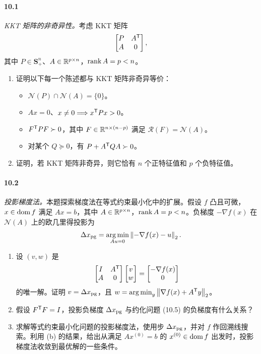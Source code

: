 \paragraph{10.1} \emph{KKT 矩阵的非奇异性。}考虑 KKT 矩阵
\[\begin{bmatrix}P&A^\mathsf T\\A&0\end{bmatrix},\]
其中 $P\in\mathbf S_+^n$、$A\in\mathbb R^{p\times n}$，$\operatorname{rank} A=p<n$。
\begin{enumerate}[label=(\alph*)]
\item 证明以下每一个陈述都与 KKT 矩阵非奇异等价：
\begin{itemize}
\item $\mathcal N(P)\cap\mathcal N(A)=\{0\}$。
\item $Ax=0$、$x\ne0\Longrightarrow x^\mathsf T Px>0$。
\item $F^\mathsf T PF\succ0$，其中 $F\in\mathbb R^{n\times(n-p)}$ 满足 $\mathcal R(F)=\mathcal N(A)$。
\item 对某个 $Q\succeq0$，有 $P+A^\mathsf T QA\succ0$。
\end{itemize}
\item 证明，若 KKT 矩阵非奇异，则它恰有 $n$ 个正特征值和 $p$ 个负特征值。
\end{enumerate}

\paragraph{10.2} \emph{投影梯度法。}本题探索梯度法在等式约束最小化中的扩展。假设 $f$ 凸且可微，$x\in\operatorname{dom} f$ 满足 $Ax=b$，其中 $A\in\mathbb R^{p\times n}$，$\operatorname{rank} A=p<n$。负梯度 $-\nabla f(x)$ 在 $\mathcal N(A)$ 上的欧几里得投影为
\[\Delta x_{\rm pg}=\operatorname*{arg\,min}_{Au=0}\left\lVert -\nabla f(x)-u\right\rVert_2.\]
\begin{enumerate}[label=(\alph*)]
\item 设 $(v,w)$ 是
\[\begin{bmatrix}I&A^\mathsf T\\A&0\end{bmatrix}\begin{bmatrix}v\\w\end{bmatrix}=\begin{bmatrix}-\nabla f(x)\\0\end{bmatrix}\]
的唯一解。证明 $v=\Delta x_{\rm pg}$，且 $w=\operatorname*{arg\,min}_y\left\lVert \nabla f(x)+A^\mathsf T y\right\rVert_2$。
\item 假设 $F^\mathsf T F=I$，投影负梯度 $\Delta x_{\rm pg}$ 与约化问题 (10.5) 的负梯度有什么关系？
\item 求解等式约束最小化问题的投影梯度法，使用步 $\Delta x_{\rm pg}$，并对 $f$ 作回溯线搜索。利用 (b) 的结果，给出从满足 $Ax^{(0)}=b$ 的 $x^{(0)}\in\operatorname{dom} f$ 出发时，投影梯度法收敛到最优解的一些条件。
\end{enumerate}

